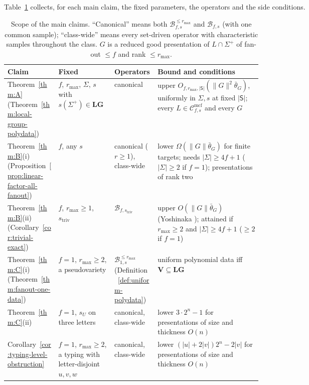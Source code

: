 \documentclass[11pt]{article}
\numberwithin{equation}{section}
\theoremstyle{plain}
\theoremstyle{definition}
\theoremstyle{remark}
\newcommand{\Cmcf}[2]{\mathcal{C}^{\mathrm{mcf}}_{#1,#2}}
\theoremstyle{plain}
\begin{document}
Table~\ref{tab:scope} collects, for each main claim, the fixed parameters,
the operators and the side conditions.

\begin{table}[htbp]
\caption{Scope of the main claims.  ``Canonical'' means both
$\mathcal B^{\le r_{\max}}_{f,s}$ and $\mathcal B_{f,s}$ (with one common sample);
``class-wide'' means every set-driven operator with characteristic samples
throughout the class.  $G$ is a reduced good presentation of $L\cap\Sigma^+$ of
fan-out $\le f$ and rank $\le r_{\max}$.}
\label{tab:scope}
\centering
\footnotesize
\setlength{\tabcolsep}{3pt}
\renewcommand{\arraystretch}{1.04}
\begin{tabularx}{\linewidth}{@{}>{\raggedright\arraybackslash}p{0.2\linewidth}>{\raggedright\arraybackslash}p{0.22\linewidth}>{\raggedright\arraybackslash}p{0.17\linewidth}>{\raggedright\arraybackslash}X@{}}
\hline
Claim & Fixed & Operators & Bound and conditions\\
\hline
Theorem~\ref{thm:A} (Theorem~\ref{thm:local-group-polydata})
 & $f$, $r_{\max}$, $\Sigma$, $s$ with $s(\Sigma^+)\in\mathbf{LG}$
 & canonical
 & upper $O_{f,r_{\max},|\mathsf S|}(\|G\|^2\bar\theta_G)$, uniformly
    in $\Sigma,s$ at fixed $|\mathsf S|$; every $L\in\Cmcf{f}{s}$ and every $G$\\
Theorem~\ref{thm:B}(i) (Proposition~\ref{prop:linear-factor-all-fanout})
 & $f$, any $s$
 & canonical ($r\ge1$), class-wide
 & lower $\Omega(\|G\|\bar\theta_G)$ for finite targets; needs $|\Sigma|\ge4f+1$ ($|\Sigma|\ge2$ if $f=1$);
   presentations of rank two\\
Theorem~\ref{thm:B}(ii) (Corollary~\ref{cor:trivial-exact})
 & $f$, $r_{\max}\ge1$, $s_{\mathrm{triv}}$
 & $\mathcal B_{f,s_{\mathrm{triv}}}$
 & upper $O(\|G\|\bar\theta_G)$ (Yoshinaka \cite{Yoshinaka2011}); attained if $r_{\max}\ge2$ and $|\Sigma|\ge4f+1$ ($\ge2$ if $f=1$)\\
Theorem~\ref{thm:C}(i) (Theorem~\ref{thm:fanout-one-data})
 & $f=1$, $r_{\max}\ge2$, a pseudovariety
 & $\mathcal B^{\le r_{\max}}_{1,s}$ (Definition~\ref{def:uniform-polydata})
 & uniform polynomial data iff $\mathbf V\subseteq\mathbf{LG}$\\
Theorem~\ref{thm:C}(ii)
  & $f=1$, $s_U$ on three letters
 & canonical, class-wide
 & lower $3\cdot2^n-1$ for presentations of size and thickness $O(n)$\\
Corollary~\ref{cor:typing-level-obstruction}
 & $f=1$, $r_{\max}\ge2$, a typing with letter-disjoint $u,v,w$
 & canonical, class-wide
 & lower $(|u|+2|v|)2^n-2|v|$ for presentations of size and thickness $O(n)$\\

\end{tabularx}
\end{table}
\end{document}
